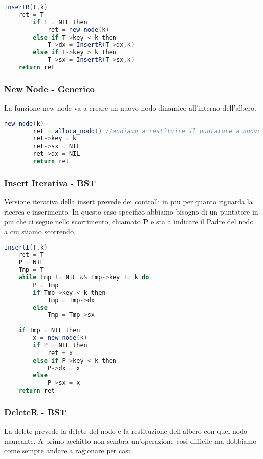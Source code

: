 \begin{lstlisting}[language=Java]
	InsertR(T,k)
	ret = T
		if T = NIL then
			ret = new_node(k)
		else if T->key < k then
			T->dx = InsertR(T->dx,k)
		else if T->key > k then
			T->sx = InsertR(T->sx,k)
	return ret
\end{lstlisting}

\subsubsection{New Node - Generico}
La funzione new node va a creare un nuovo nodo dinamico all'interno dell'albero.

\begin{lstlisting}[language=Java]
	new_node(k)
		ret = alloca_nodo() //andiamo a restituire il puntatore a nuovo nodo allocato in memoria a ret
		ret->key = k
		ret->sx = NIL
		ret->dx = NIL
		return ret
\end{lstlisting}

\subsubsection{Insert Iterativa - BST}
Versione iterativa della insert prevede dei controlli in piu per quanto riguarda la ricerca e inserimento. In questo caso specifico abbiamo bisogno di un puntatore in piu che ci segue nello scorrimento, chiamato \textbf{P} e sta a indicare il Padre del nodo a cui stiamo scorrendo.

\begin{lstlisting}[language=Java]
	InsertI(T,k)
	ret = T
	P = NIL
	Tmp = T
	while Tmp != NIL && Tmp->key != k do
		P = Tmp
		if Tmp->key < k then
			Tmp = Tmp->dx
		else
			Tmp = Tmp->sx
	
	if Tmp = NIL then
		x = new_node(k)
		if P = NIL then
			ret = x
		else if P->key < k then
			P->dx = x
		else
			P->sx = x
	return ret
\end{lstlisting}

\subsubsection{DeleteR - BST}
La delete prevede la delete del nodo e la restituzione dell'albero con quel nodo mancante. A primo acchitto non sembra un'operazione cosi difficile ma dobbiamo come sempre andare a ragionare per casi.

